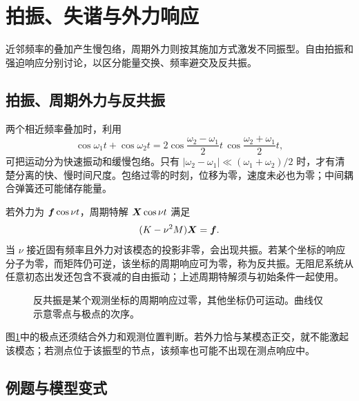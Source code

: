 \section{拍振、失谐与外力响应}

近邻频率的叠加产生慢包络，周期外力则按其施加方式激发不同振型。自由拍振和强迫响应分别讨论，以区分能量交换、频率避交及反共振。



\subsection{拍振、周期外力与反共振}
两个相近频率叠加时，利用
\[
\cos\omega_1t+\cos\omega_2t
=2\cos\frac{\omega_2-\omega_1}{2}t\,
\cos\frac{\omega_2+\omega_1}{2}t,
\]
可把运动分为快速振动和缓慢包络。只有 $|\omega_2-\omega_1|\ll(\omega_1+\omega_2)/2$ 时，才有清楚分离的快、慢时间尺度。包络过零的时刻，位移为零，速度未必也为零；中间耦合弹簧还可能储存能量。

若外力为 $\bm{f}\cos\nu t$，周期特解 $\bm{X}\cos\nu t$ 满足
\begin{equation}
(K-\nu^2M)\bm{X}=\bm{f}.
\label{sup4:eq:d7-forced}
\end{equation}
当 $\nu$ 接近固有频率且外力对该模态的投影非零，会出现共振。若某个坐标的响应分子为零，而矩阵仍可逆，该坐标的周期响应可为零，称为反共振。无阻尼系统从任意初态出发还包含不衰减的自由振动；上述周期特解须与初始条件一起使用。
\begin{figure}[H]\centering
{}
\caption{反共振是某个观测坐标的周期响应过零，其他坐标仍可运动。曲线仅示意零点与极点的次序。}\label{sup4:fig:d7-antiresonance}
\end{figure}
图\ref{sup4:fig:d7-antiresonance}中的极点还须结合外力和观测位置判断。若外力恰与某模态正交，就不能激起该模态；若测点位于该振型的节点，该频率也可能不出现在测点响应中。


\subsection{例题与模型变式}


